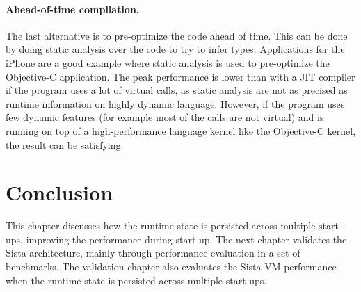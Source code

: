 \documentclass[a4paper,12pt,twoside]{../includes/ThesisStyle}
\begin{document}
\paragraph{Ahead-of-time compilation.}

The last alternative is to pre-optimize the code ahead of time. This can be done by doing static analysis over the code to try to infer types. Applications for the iPhone are a good example where static analysis is used to pre-optimize the Objective-C application. The peak performance is lower than with a JIT compiler if the program uses a lot of virtual calls, as static analysis are not as precised as runtime information on highly dynamic language. 
However, if the program uses few dynamic features (for example most of the calls are not virtual) and is running on top of a high-performance language kernel like the Objective-C kernel, the result can be satisfying.


\section*{Conclusion} This chapter discusses how the runtime state is persisted across multiple start-ups, improving the performance during start-up. The next chapter validates the Sista architecture, mainly through performance evaluation in a set of benchmarks. The validation chapter also evaluates the Sista VM performance when the runtime state is persisted across multiple start-ups.

\ifx\wholebook\relax\else
    
\end{document}
